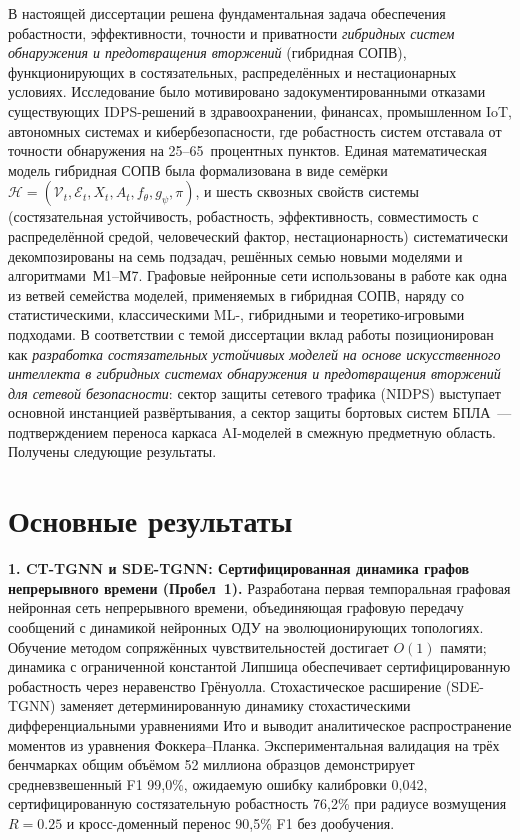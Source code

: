 В настоящей диссертации решена фундаментальная задача обеспечения
робастности, эффективности, точности и приватности \emph{гибридных
систем обнаружения и предотвращения вторжений} (гибридная СОПВ),
функционирующих в состязательных, распределённых и нестационарных
условиях. Исследование было мотивировано задокументированными
отказами существующих IDPS-решений в здравоохранении, финансах,
промышленном IoT, автономных системах и кибербезопасности, где
робастность систем отставала от точности обнаружения на
25--65~процентных пунктов. Единая математическая модель
гибридная СОПВ была формализована в виде семёрки
$\mathcal{H} = (\mathcal{V}_t, \mathcal{E}_t, X_t, A_t, f_\theta,
g_\psi, \pi)$, и шесть сквозных свойств системы (состязательная
устойчивость, робастность, эффективность, совместимость с
распределённой средой, человеческий фактор, нестационарность)
систематически декомпозированы на семь подзадач, решённых семью
новыми моделями и алгоритмами~М1--М7. Графовые нейронные сети
использованы в работе как одна из ветвей семейства моделей,
применяемых в гибридная СОПВ, наряду со статистическими, классическими
ML-, гибридными и теоретико-игровыми подходами. В соответствии с
темой диссертации вклад работы позиционирован как \emph{разработка
состязательных устойчивых моделей на основе искусственного
интеллекта в гибридных системах обнаружения и предотвращения
вторжений для сетевой безопасности}: сектор защиты сетевого
трафика (NIDPS) выступает основной инстанцией развёртывания, а
сектор защиты бортовых систем БПЛА~--- подтверждением переноса
каркаса AI-моделей в смежную предметную область. Получены
следующие результаты.

\section*{Основные результаты}

\noindent\textbf{1. CT-TGNN и SDE-TGNN: Сертифицированная динамика графов непрерывного времени (Пробел~1).}
Разработана первая темпоральная графовая нейронная сеть непрерывного времени, объединяющая графовую передачу сообщений с динамикой нейронных ОДУ на эволюционирующих топологиях. Обучение методом сопряжённых чувствительностей достигает $O(1)$ памяти; динамика с ограниченной константой Липшица обеспечивает сертифицированную робастность через неравенство Грёнуолла. Стохастическое расширение (SDE-TGNN) заменяет детерминированную динамику стохастическими дифференциальными уравнениями Ито и выводит аналитическое распространение моментов из уравнения Фоккера--Планка. Экспериментальная валидация на трёх бенчмарках общим объёмом 52 миллиона образцов демонстрирует средневзвешенный F1 99,0\%, ожидаемую ошибку калибровки 0,042, сертифицированную состязательную робастность 76,2\% при радиусе возмущения $R=0.25$ и кросс-доменный перенос 90,5\% F1 без дообучения.

